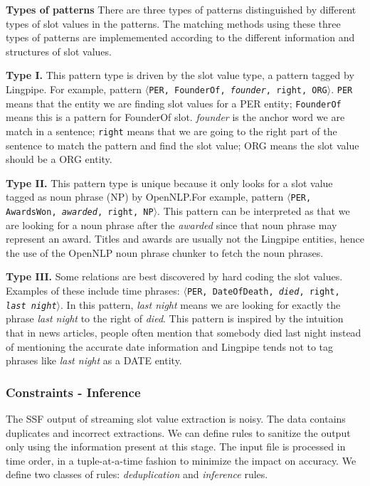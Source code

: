 \textbf{Types of patterns}
There are three types of patterns distinguished by different types of slot values in the patterns. The matching methods using these three types of patterns are implememented according to the different information and structures of slot values.

 
\textbf{Type I.} This pattern type is driven by the slot value type, a pattern tagged by Lingpipe. For example, pattern $\langle$\texttt{PER, FounderOf, \textit{founder}, right, ORG}$\rangle$. \texttt{PER} means 
that the entity we are finding slot values for a PER entity; \texttt{FounderOf} means this is a pattern for FounderOf slot. \textit{founder} is the anchor word we are match in a sentence; \texttt{right} means that we are going to the right part of the sentence to match the pattern and find the slot value; ORG means the slot value should be a ORG entity.

\textbf{Type II.} This pattern type is unique because it only looks for a slot value tagged as noun phrase (NP) by OpenNLP.\@ For example, pattern $\langle$\texttt{PER, AwardsWon, \textit{awarded}, right, NP}$\rangle$. This pattern can be interpreted as that we are looking for a noun phrase after the \textit{awarded} since that noun phrase may represent an award. Titles and awards are usually not the Lingpipe entities, hence the use of the OpenNLP noun phrase chunker to fetch the noun phrases.

\textbf{Type III.} Some relations are best discovered by hard coding the slot values. Examples of these include time phrases: $\langle$\texttt{PER, DateOfDeath, \textit{died}, right, \textit{last night}}$\rangle$. In this pattern, \textit{last night} means we are looking for exactly the phrase \textit{last night} to the right of \textit{died}. This pattern is inspired by the intuition that in news articles, people often mention that somebody died last night instead of mentioning the accurate date information and Lingpipe tends not to tag phrases like \textit{last night} as a DATE entity. 


\subsubsection{Constraints - Inference}

The SSF output of streaming slot value extraction is noisy. The data contains duplicates and incorrect extractions. We can define rules to sanitize the output only using the information present at this stage. The input file is processed in time order, in a tuple-at-a-time fashion to minimize the impact on accuracy. We define two classes of rules: \textit{deduplication} and \textit{inference} rules.

